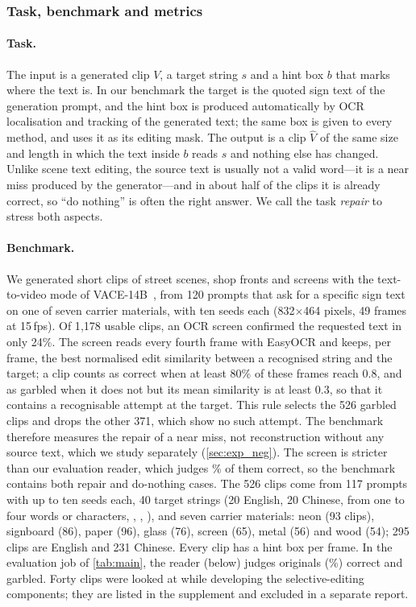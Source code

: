 \subsubsection{Task, benchmark and metrics}
\label{sec:task}

\paragraph{Task.} The input is a generated clip $V$, a target string $s$ and a hint box $b$ that marks where the text is. In our benchmark the target is the quoted sign text of the generation prompt, and the hint box is produced automatically by OCR localisation and tracking of the generated text; the same box is given to every method, and \steer uses it as its editing mask. The output is a clip $\hat V$ of the same size and length in which the text inside $b$ reads $s$ and nothing else has changed. Unlike scene text editing, the source text is usually not a valid word---it is a near miss produced by the generator---and in about half of the clips it is already correct, so ``do nothing'' is often the right answer. We call the task \emph{repair} to stress both aspects.

\paragraph{Benchmark.} We generated short clips of street scenes, shop fronts and screens with the text-to-video mode of VACE-14B~\cite{jiang2025vace}, from 120 prompts that ask for a specific sign text on one of seven carrier materials, with ten seeds each (832$\times$464 pixels, 49 frames at 15\,fps). Of 1{,}178 usable clips, an OCR screen confirmed the requested text in only 24\%. The screen reads every fourth frame with EasyOCR and keeps, per frame, the best normalised edit similarity between a recognised string and the target; a clip counts as correct when at least 80\% of these frames reach 0.8, and as garbled when it does not but its mean similarity is at least 0.3, so that it contains a recognisable attempt at the target. This rule selects the 526 garbled clips and drops the other 371, which show no such attempt. The benchmark therefore measures the repair of a near miss, not reconstruction without any source text, which we study separately (\cref{sec:exp_neg}). The screen is stricter than our evaluation reader, which judges \rOrigRead\% of them correct, so the benchmark contains both repair and do-nothing cases. The 526 clips come from 117 prompts with up to ten seeds each, 40 target strings (20 English, 20 Chinese, from one to four words or characters, \eg {}, , ), and seven carrier materials: neon (93 clips), signboard (86), paper (96), glass (76), screen (65), metal (56) and wood (54); 295 clips are English and 231 Chinese. Every clip has a hint box per frame. In the evaluation job of \cref{tab:main}, the reader (below) judges \rOrigCorrect{} originals (\rOrigRead\%) correct and \rGarbled{} garbled. Forty clips were looked at while developing the selective-editing components; they are listed in the supplement and excluded in a separate report.

